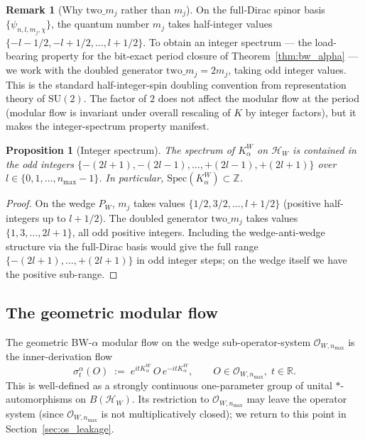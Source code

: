 \documentclass[11pt,a4paper]{article}
\theoremstyle{plain}
\newtheorem{proposition}[theorem]{Proposition}
\theoremstyle{definition}
\newtheorem{remark}[theorem]{Remark}
\newcommand{\nmax}{n_{\max}}
\newcommand{\Hilb}{\mathcal{H}}
\newcommand{\Op}{\mathcal{O}}
\newcommand{\R}{\mathbb{R}}
\newcommand{\Z}{\mathbb{Z}}
\newcommand{\SU}{\mathrm{SU}}
\begin{document}
\begin{remark}[Why $\mathrm{two}\_m_j$ rather than $m_j$]
\label{rem:two_m_j}
On the full-Dirac spinor basis $\{\psi_{n, l, m_j, \chi}\}$, the
quantum number $m_j$ takes half-integer values
$\{-l - 1/2, -l + 1/2, \ldots, l + 1/2\}$. To obtain an integer
spectrum --- the load-bearing property for the bit-exact period
closure of Theorem~\ref{thm:bw_alpha} --- we work with the doubled
generator $\mathrm{two}\_m_j = 2 m_j$, taking odd integer values.
This is the standard half-integer-spin doubling convention from
representation theory of $\SU(2)$. The factor of $2$ does not affect
the modular flow at the period (modular flow is invariant under
overall rescaling of $K$ by integer factors), but it makes the
integer-spectrum property manifest.
\end{remark}

\begin{proposition}[Integer spectrum]\label{prop:integer_spectrum}
The spectrum of $K_\alpha^W$ on $\Hilb_W$ is contained in the odd
integers $\{-(2l+1), -(2l-1), \ldots, +(2l-1), +(2l+1)\}$ over
$l \in \{0, 1, \ldots, \nmax - 1\}$. In particular,
$\mathrm{Spec}(K_\alpha^W) \subset \Z$.
\end{proposition}

\begin{proof}
On the wedge $P_W$, $m_j$ takes values $\{1/2, 3/2, \ldots, l + 1/2\}$
(positive half-integers up to $l + 1/2$). The doubled generator
$\mathrm{two}\_m_j$ takes values $\{1, 3, \ldots, 2l + 1\}$, all odd
positive integers. Including the wedge-anti-wedge structure via the
full-Dirac basis would give the full range $\{-(2l+1), \ldots, +(2l+1)\}$
in odd integer steps; on the wedge itself we have the positive
sub-range.
\end{proof}

\subsection{The geometric modular flow}\label{sec:alpha_flow}

The geometric BW-$\alpha$ modular flow on the wedge sub-operator-system
$\Op_{W, \nmax}$ is the inner-derivation flow
\begin{equation}\label{eq:alpha_flow}
   \sigma_t^{\alpha}(O)
   \;:=\; e^{i t K_\alpha^W}\, O\, e^{-i t K_\alpha^W},
   \qquad O \in \Op_{W, \nmax},\; t \in \R.
\end{equation}
This is well-defined as a strongly continuous one-parameter group of
unital $*$-automorphisms on $B(\Hilb_W)$. Its restriction to
$\Op_{W, \nmax}$ may leave the operator system (since $\Op_{W, \nmax}$
is not multiplicatively closed); we return to this point in
Section~\ref{sec:os_leakage}.
\end{document}
